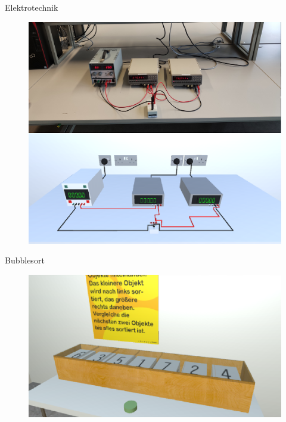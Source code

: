 \documentclass[final,hyperref={pdfpagelabels=false}]{beamer}
\begin{document}
\begin{frame}[t]
\begin{columns}[t]
\begin{column}{.465\textwidth}
\begin{block}{Elektrotechnik}
	
	\begin{figure}
		\centering
		\includegraphics[width=0.95\linewidth]{etechnik_vgl}

	\end{figure}
	\vspace{20px}
\end{block}

\vspace{0.3cm}

\begin{block}{Bubblesort}
	\begin{figure}
		\centering
		\includegraphics[width=0.95\linewidth]{informatiklab_bubblesort}

	\end{figure}
\end{block}


\end{column}
\end{columns}
\end{frame}
\end{document}

